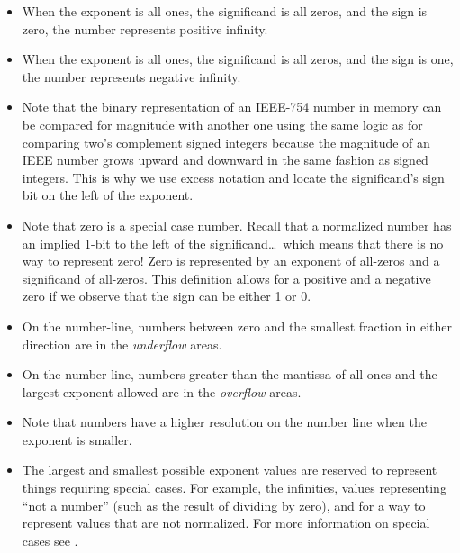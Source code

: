 \begin{itemize}
\item When the exponent is all ones, the significand is all zeros, and
the sign is zero, the number represents positive infinity.

\item When the exponent is all ones, the significand is all zeros, and
the sign is one, the number represents negative infinity.

\item Note that the binary representation of an IEEE-754 number in memory
can be compared for magnitude with another one using the same logic as for
comparing two's complement signed integers because the magnitude of an 
IEEE number grows upward and downward in the same fashion as signed integers.
This is why we use excess notation and locate the significand's sign bit on
the left of the exponent.

\item Note that zero is a special case number.  Recall that a normalized
number has an implied 1-bit to the left of the significand\ldots\ which
means that there is no way to represent zero!
Zero is represented by an exponent of all-zeros and a significand of 
all-zeros.  This definition allows for a positive and a negative zero 
if we observe that the sign can be either 1 or 0.

\item On the number-line, numbers between zero and the smallest fraction in 
either direction are in the {\em \gls{underflow}} areas.

\item On the number line, numbers greater than the mantissa of all-ones and the 
largest exponent allowed are in the {\em \gls{overflow}} areas.

\item Note that numbers have a higher resolution on the number line when the 
exponent is smaller.

\item The largest and smallest possible exponent values are reserved to represent
things requiring special cases. For example, the infinities, values representing
``not a number'' (such as the result of dividing by zero), and for a way to represent
values that are not normalized. For more information on special cases see \cite{ieee:754}.

\end{itemize}

